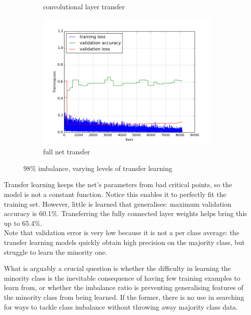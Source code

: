 \documentclass[a4paper,11pt]{article}
\begin{document}
\begin{figure}
\begin{minipage}[b]{\textwidth}
\begin{subfigure}{.5\textwidth}
        \caption{convolutional layer transfer}\label{fig:2b}
      \end{subfigure} \par \vspace*{3pt} %
      \begin{subfigure}{.5\textwidth} 
        \centering
        \includegraphics[scale=0.4]{images/plot_clampdetCI98_none_bs128_lr4.png}
        \caption{full net transfer}\label{fig:2b}
      \end{subfigure} \par \vspace*{3pt} %
      \caption{98\% imbalance, varying levels of transfer learning}\label{fig:2}
    \end{minipage}%
\end{figure}

Transfer learning keeps the net's parameters from bad critical points, so the model is not a constant function. Notice this enables it to perfectly fit the training set. However, little is learned that generalises: maximum validation accuracy is 60.1\%. Transferring the fully connected layer weights helps bring this up to 65.4\%. \\

Note that validation error is very low because it is not a per class average: the transfer learning models quickly obtain high precision on the majority class, but struggle to learn the minority one. 

What is arguably a crucial question is whether the difficulty in learning the minority class is the inevitable consequence of having few training examples to learn from, or whether the imbalance ratio is preventing generalising features of the minority class from being learned. If the former, there is no use in searching for ways to tackle class imbalance without throwing away majority class data.  \\
\end{document}
